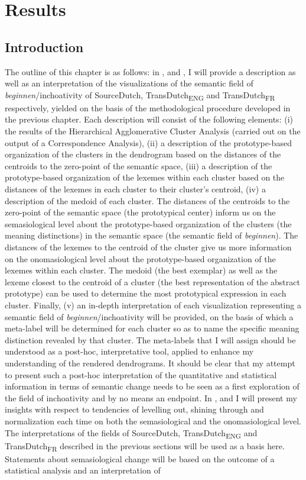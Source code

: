 \chapter{Results}
\label{sec:4}
\section{Introduction}
\label{sec:4.1}  
The outline of this chapter is as follows: in ,  and , I will provide a description as well as an interpretation of the visualizations of the semantic field of \textit{beginnen}/inchoativity of SourceDutch, TransDutch\textsubscript{ENG} and TransDutch\textsubscript{FR} respectively, yielded on the basis of the methodological procedure developed in the previous chapter. Each description will consist of the following elements: (i) the results of the Hierarchical Agglomerative Cluster Analysis (carried out on the output of a Correspondence Analysis), (ii) a description of the prototype-based organization of the clusters in the dendrogram based on the distances of the centroids to the zero-point of the semantic space, (iii) a description of the prototype-based organization of the lexemes within each cluster based on the distances of the lexemes in each cluster to their cluster’s centroid, (iv) a description of the medoid of each cluster. The distances of the centroids to the zero-point of the semantic space (the prototypical center) inform us on the semasiological level about the prototype-based organization of the clusters (the meaning distinctions) in the semantic space (the semantic field of \textit{beginnen}). The distances of the lexemes to the centroid of the cluster give us more information on the onomasiological level about the prototype-based organization of the lexemes within each cluster. The medoid (the best exemplar) as well as the lexeme closest to the centroid of a cluster (the best representation of the abstract prototype) can be used to determine the most prototypical expression in each cluster. Finally, (v) an in-depth interpretation of each visualization representing a semantic field of \textit{beginnen}/inchoativity will be provided, on the basis of which a meta-label will be determined for each cluster so as to name the specific meaning distinction revealed by that cluster. The meta-labels that I will assign should be understood as a post-hoc, interpretative tool, applied to enhance my understanding of the rendered dendrograms. It should be clear that my attempt to present such a post-hoc interpretation of the quantitative and statistical information in terms of semantic change needs to be seen as a first exploration of the field of inchoativity and by no means an endpoint. In ,  and  I will present my insights with respect to tendencies of levelling out, shining through and normalization each time on both the semasiological and the onomasiological level. The interpretations of the fields of SourceDutch, TransDutch\textsubscript{ENG} and TransDutch\textsubscript{FR} described in the previous sections will be used as a basis here. Statements about semasiological change will be based on the outcome of a statistical analysis and an interpretation of 